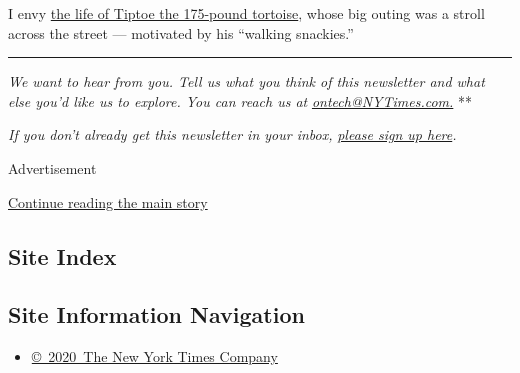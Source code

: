 I envy
\href{https://www.tiktok.com/@caitlindorann/video/6866129235405245702?_d=secCgsIARCbDRgBIAIoARI\%2BCjwkb1OiMDqnufxPGDyf3tc4Sx0KYUTRMxXC2zak\%2BQx1xVyp4PXqIZn7N7NvJcV\%2FgsFY2olKQMBxp9XhwhYaAA\%3D\%3D\&language=en\&preview_pb=0\&sec_user_id=MS4wLjABAAAAMRA6cray9TND3Cj4-GeI-c6RkJGLCHeGC0tcYt2Htx6QIRj5ul4usQ41y9ncry57\&share_app_name=musically\&share_item_id=6866129235405245702\&share_link_id=befd23d1-d72e-48a0-9419-13638bb45a8d\&timestamp=1599097671\&u_code=dbilh20db37fag\&user_id=6811584884517651461\&utm_campaign=client_share\&utm_medium=android\&utm_source=copy\&source=h5_m}{the
life of Tiptoe the 175-pound tortoise}, whose big outing was a stroll
across the street --- motivated by his ``walking snackies.''

\begin{center}\rule{0.5\linewidth}{\linethickness}\end{center}

\emph{We want to hear from you. Tell us what you think of this
newsletter and what else you'd like us to explore. You can reach us at}
\href{mailto:ontech@NYTimes.com?subject=On\%20Tech\%20Feedback}{\emph{ontech@NYTimes.com.}}
**

\emph{If you don't already get this newsletter in your inbox,}
\href{https://www.nytimes3xbfgragh.onion/newsletters/signup/OT}{\emph{please
sign up here}}\emph{.}

Advertisement

\protect\hyperlink{after-bottom}{Continue reading the main story}

\hypertarget{site-index}{%
\subsection{Site Index}\label{site-index}}

\hypertarget{site-information-navigation}{%
\subsection{Site Information
Navigation}\label{site-information-navigation}}

\begin{itemize}
\tightlist
\item
  \href{https://help.nytimes3xbfgragh.onion/hc/en-us/articles/115014792127-Copyright-notice}{©~2020~The
  New York Times Company}
\end{itemize}

